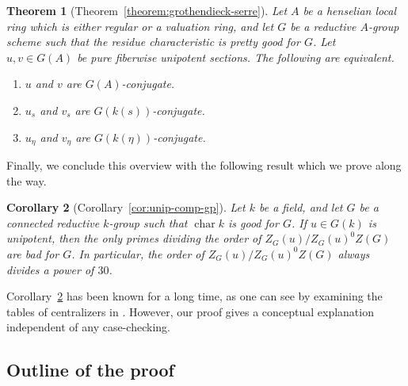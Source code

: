 \documentclass[11pt,reqno]{amsart}
\newtheorem{theorem}{Theorem}[section]
\newtheorem{cor}[theorem]{Corollary}
\theoremstyle{definition}
\DeclareMathOperator{\chara}{char}
\begin{document}
\begin{theorem}[Theorem~\ref{theorem:grothendieck-serre}]\label{theorem:intro-grothendieck-serre}
Let $A$ be a henselian local ring which is either regular or a valuation ring, and let $G$ be a reductive $A$-group scheme such that the residue characteristic is pretty good for $G$. Let $u, v \in G(A)$ be pure fiberwise unipotent sections. The following are equivalent.
\begin{enumerate}
    \item $u$ and $v$ are $G(A)$-conjugate.
    \item $u_s$ and $v_s$ are $G(k(s))$-conjugate.
    \item $u_\eta$ and $v_\eta$ are $G(k(\eta))$-conjugate.
\end{enumerate}
\end{theorem}

Finally, we conclude this overview with the following result which we prove along the way.

\begin{cor}[Corollary~\ref{cor:unip-comp-gp}]\label{cor:intro-unip-comp-gp}
Let $k$ be a field, and let $G$ be a connected reductive $k$-group such that $\chara k$ is good for $G$. If $u \in G(k)$ is unipotent, then the only primes dividing the order of $Z_G(u)/Z_G(u)^0Z(G)$ are bad for $G$. In particular, the order of $Z_G(u)/Z_G(u)^0Z(G)$ always divides a power of $30$.
\end{cor}

Corollary~\ref{cor:intro-unip-comp-gp} has been known for a long time, as one can see by examining the tables of centralizers in \cite{Liebeck-Seitz}. However, our proof gives a conceptual explanation independent of any case-checking.

\subsection{Outline of the proof}\label{subsection:outline}
\end{document}
